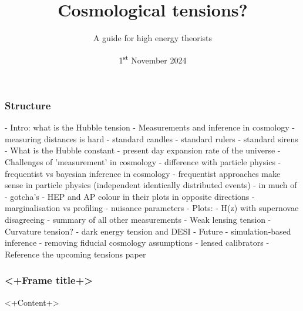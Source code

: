 \documentclass[aspectratio=169]{beamer}
\title{Cosmological tensions?}
\subtitle{A guide for high energy theorists}
\date{1\textsuperscript{st} November 2024}
\begin{document}
\begin{frame}
    \titlepage
\end{frame}

\begin{frame}
    \frametitle{Structure}
    - Intro: what is the Hubble tension
    - Measurements and inference in cosmology
        - measuring distances is hard
            - standard candles
            - standard rulers
            - standard sirens
    - What is the Hubble constant
        - present day expansion rate of the universe
    - Challenges of 'measurement' in cosmology
        - difference with particle physics
    - frequentist vs bayesian inference in cosmology
        - frequentist approaches make sense in particle physics (independent identically distributed events)
        - in much of 
    - gotcha's
        - HEP and AP colour in their plots in opposite directions
        - marginalisation vs profiling
        - nuisance parameters
    - Plots:
        - H(z) with supernovae disagreeing
        - summary of all other measurements
    - Weak lensing tension
    - Curvature tension?
    - dark energy tension and DESI
    - Future
        - simulation-based inference
        - removing fiducial cosmology assumptions
        - lensed calibrators
    - Reference the upcoming tensions paper
\end{frame}

\begin{frame}
    \frametitle{<+Frame title+>}
    <+Content+>
\end{frame}
\end{document}
